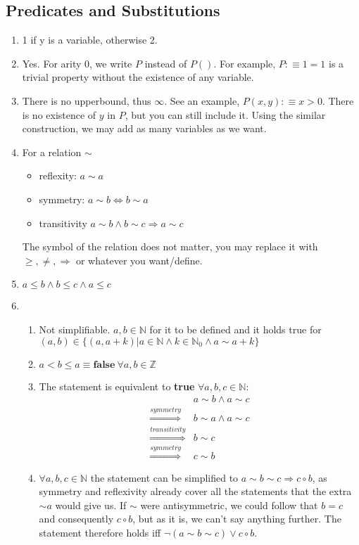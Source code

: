 \documentclass[12pt]{article}
\begin{document}
\subsection*{Predicates and Substitutions}
\begin{enumerate}
    \item 1 if y is a variable, otherwise 2.
    \item Yes. For arity 0, we write $P$ instead of $P()$. 
    For example, $P :\equiv 1 = 1$ is a trivial property without the existence of any variable.
    \item There is no upperbound, thus $\infty$. See an example, $P(x, y) :\equiv x > 0$. 
    There is no existence of $y$ in $P$, but you can still include it. Using the similar 
    construction, we may add as many variables as we want.
    \item For a relation $\sim$
    \begin{itemize}
        \item reflexity: $a \sim a$
        \item symmetry: $a \sim b \iff b \sim a$
        \item transitivity $a \sim b \land b \sim c \Longrightarrow a \sim c$
    \end{itemize}
    The symbol of the relation does not matter, you may replace it with $\geq, \not=, \Longrightarrow$ or whatever you want/define.
    \item $a \leq b \land b \leq c \land a \leq c$
    \item 
    \begin{enumerate}
        \item Not simplifiable. $a, b \in \mathbb{N}$ for it to be defined and it holds true for $(a, b) \in \{(a, a + k) | a \in \mathbb{N} \land k \in \mathbb{N}_0 \land a \sim a + k\}$
        \item $a < b \leq a \equiv \textbf{false}\ \forall a, b \in \mathbb{Z}$
        \item The statement is equivalent to \textbf{true} $\forall a,b,c \in \mathbb{N}$:
        \begin{align*}
            &a \sim b \land a \sim c \\
            \overset{symmetry}{\Longrightarrow} &b \sim a \land a \sim c\\
            \overset{transitivity}{\Longrightarrow} &b \sim c\\
            \overset{symmetry}{\Longrightarrow} &c \sim b
        \end{align*}
        \item $\forall a, b, c \in \mathbb{N}$ the statement can be simplified to $a \sim b \sim c \Longrightarrow c \circ b$, as symmetry and reflexivity already cover all the statements that the extra $\sim a$ would give us. If $\sim$ were antisymmetric, we could follow that $b = c$ and consequently $c \circ b$, but as it is, we can't say anything further. The statement therefore holds iff $\neg(a \sim b \sim c) \lor c \circ b$.

\end{enumerate}
\end{enumerate}
\end{document}
